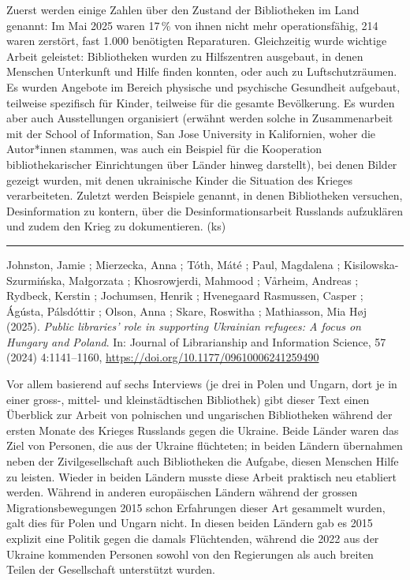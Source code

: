\documentclass[a4paper,
fontsize=11pt,
oneside,
numbers=noperiodatend,
parskip=half-,
bibliography=totoc,
final
]{scrartcl}
\begin{document}
Zuerst werden einige Zahlen über den Zustand der Bibliotheken im Land
genannt: Im Mai 2025 waren 17\,\% von ihnen nicht mehr operationsfähig,
214 waren zerstört, fast 1.000 benötigten Reparaturen. Gleichzeitig
wurde wichtige Arbeit geleistet: Bibliotheken wurden zu Hilfszentren
ausgebaut, in denen Menschen Unterkunft und Hilfe finden konnten, oder
auch zu Luftschutzräumen. Es wurden Angebote im Bereich physische und
psychische Gesundheit aufgebaut, teilweise spezifisch für Kinder,
teilweise für die gesamte Bevölkerung. Es wurden aber auch Ausstellungen
organisiert (erwähnt werden solche in Zusammenarbeit mit der School of
Information, San Jose University in Kalifornien, woher die Autor*innen
stammen, was auch ein Beispiel für die Kooperation bibliothekarischer
Einrichtungen über Länder hinweg darstellt), bei denen Bilder gezeigt
wurden, mit denen ukrainische Kinder die Situation des Krieges
verarbeiteten. Zuletzt werden Beispiele genannt, in denen Bibliotheken
versuchen, Desinformation zu kontern, über die Desinformationsarbeit
Russlands aufzuklären und zudem den Krieg zu dokumentieren. (ks)

\begin{center}\rule{0.5\linewidth}{0.5pt}\end{center}

Johnston, Jamie ; Mierzecka, Anna ; Tóth, Máté ; Paul, Magdalena ;
Kisilowska-Szurmińska, Małgorzata ; Khosrowjerdi, Mahmood ; Vårheim,
Andreas ; Rydbeck, Kerstin ; Jochumsen, Henrik ; Hvenegaard Rasmussen,
Casper ; Ágústa, Pálsdóttir ; Olson, Anna ; Skare, Roswitha ;
Mathiasson, Mia Høj (2025). \emph{Public libraries' role in supporting
Ukrainian refugees: A focus on Hungary and Poland}. In: Journal of
Librarianship and Information Science, 57 (2024) 4:1141--1160,
\url{https://doi.org/10.1177/09610006241259490}

Vor allem basierend auf sechs Interviews (je drei in Polen und Ungarn,
dort je in einer gross-, mittel- und kleinstädtischen Bibliothek) gibt
dieser Text einen Überblick zur Arbeit von polnischen und ungarischen
Bibliotheken während der ersten Monate des Krieges Russlands gegen die
Ukraine. Beide Länder waren das Ziel von Personen, die aus der Ukraine
flüchteten; in beiden Ländern übernahmen neben der Zivilgesellschaft
auch Bibliotheken die Aufgabe, diesen Menschen Hilfe zu leisten. Wieder
in beiden Ländern musste diese Arbeit praktisch neu etabliert werden.
Während in anderen europäischen Ländern während der grossen
Migrationsbewegungen 2015 schon Erfahrungen dieser Art gesammelt wurden,
galt dies für Polen und Ungarn nicht. In diesen beiden Ländern gab es
2015 explizit eine Politik gegen die damals Flüchtenden, während die
2022 aus der Ukraine kommenden Personen sowohl von den Regierungen als
auch breiten Teilen der Gesellschaft unterstützt wurden.
\end{document}
